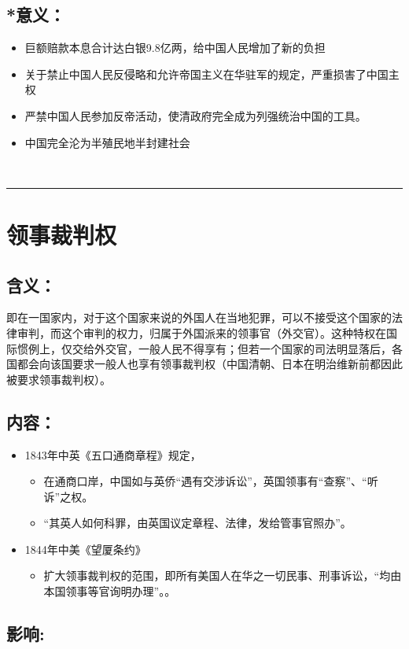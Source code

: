 \documentclass{article}
\begin{document}
\subsection*{*意义：}
\begin{itemize}
    \item 巨额赔款本息合计达白银9.8亿两，给中国人民增加了新的负担
    \item 关于禁止中国人民反侵略和允许帝国主义在华驻军的规定，严重损害了中国主权
    \item 严禁中国人民参加反帝活动，使清政府完全成为列强统治中国的工具。
    \item 中国完全沦为半殖民地半封建社会
\end{itemize}


\ \hrule

\section*{领事裁判权}
\subsection*{含义：}
\noindent 即在一国家内，对于这个国家来说的外国人在当地犯罪，可以不接受这个国家的法律审判，而这个审判的权力，归属于外国派来的领事官（外交官）。这种特权在国际惯例上，仅交给外交官，一般人民不得享有；但若一个国家的司法明显落后，各国都会向该国要求一般人也享有领事裁判权（中国清朝、日本在明治维新前都因此被要求领事裁判权）。
\subsection*{内容：}
\begin{itemize}
    \item 1843年中英《五口通商章程》规定，
    \begin{itemize}
        \item 在通商口岸，中国如与英侨“遇有交涉诉讼”，英国领事有“查察”、“听诉”之权。
        \item “其英人如何科罪，由英国议定章程、法律，发给管事官照办”。
    \end{itemize}
    \item 1844年中美《望厦条约》
    \begin{itemize}
        \item 扩大领事裁判权的范围，即所有美国人在华之一切民事、刑事诉讼，“均由本国领事等官询明办理”。。
    \end{itemize}
\end{itemize}
\subsection*{影响:}
\end{document}
